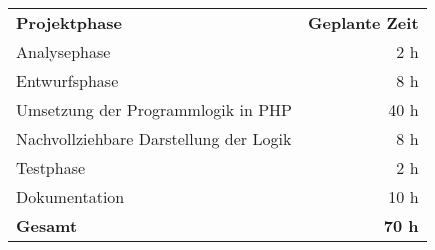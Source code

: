 \begin{tabular}{lr}
\rowcolor{heading}\textbf{Projektphase} & \textbf{Geplante Zeit} \\
Analysephase & 2 h \\
\rowcolor{odd}Entwurfsphase & 8 h \\
Umsetzung der Programmlogik in PHP & 40 h \\
\rowcolor{odd}Nachvollziehbare Darstellung der Logik & 8 h \\
Testphase & 2 h \\
\rowcolor{odd}Dokumentation & 10 h \\
\hline
\hline
\rowcolor{odd}\textbf{Gesamt} & \textbf{70 h} \\
\end{tabular}
